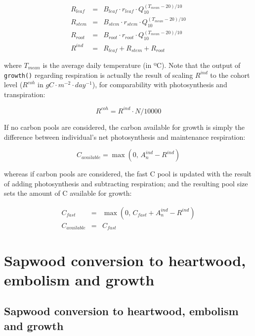 \documentclass[]{book}
\begin{document}
\begin{eqnarray}
R_{leaf} &=& B_{leaf} \cdot r_{leaf} \cdot Q_{10}^{(T_{mean}-20)/10} \\
R_{stem} &=& B_{stem} \cdot r_{stem} \cdot Q_{10}^{(T_{mean}-20)/10} \\
R_{root} &=& B_{root} \cdot r_{root} \cdot Q_{10}^{(T_{mean}-20)/10} \\
R^{ind} &=& R_{leaf}+R_{stem}+R_{root}
\end{eqnarray}

where \(T_{mean}\) is the average daily temperature (in ºC). Note that
the output of \texttt{growth()} regarding respiration is actually the
result of scaling \(R^{ind}\) to the cohort level (\(R^{coh}\) in
\(g C · m^{-2} · day^{-1}\)), for comparability with photosynthesis and
transpiration:

\begin{equation}
R^{coh} =  R^{ind} \cdot N / 10000
\end{equation}

If no carbon pools are considered, the carbon available for growth is
simply the difference between individual's net photosynthesis and
maintenance respiration:

\begin{equation}
C_{available} = \max(0,\, A_n^{ind} -  R^{ind})
\end{equation}

whereas if carbon pools are considered, the fast C pool is updated with
the result of adding photosynthesis and subtracting respiration; and the
resulting pool size sets the amount of C available for growth:

\begin{eqnarray}
C_{fast} &=& \max(0,\,C_{fast} + A_n^{ind} -  R^{ind})\\
C_{available} &=& C_{fast}
\end{eqnarray}

\chapter{Sapwood conversion to heartwood, embolism and
growth}\label{sapwood-conversion-to-heartwood-embolism-and-growth}

\section{Sapwood conversion to heartwood, embolism and
growth}\label{sapwood-conversion-to-heartwood-embolism-and-growth-1}
\end{document}
